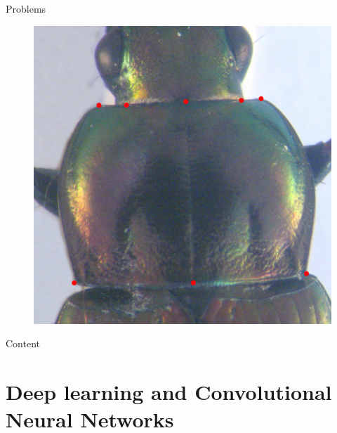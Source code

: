 \documentclass[10pt]{beamer}
\begin{document}
\begin{frame}{Problems}{}
\begin{figure}[htbp]
{        }
        {
        	\only<2>{\hspace{3cm}}
         \includegraphics[scale=.055]{images/prono_003_lm}
         }
	\end{figure}
\end{frame}

\begin{frame}{Content}{}
\tableofcontents
\end{frame}
\section{Deep learning and Convolutional Neural Networks}
\end{document}
